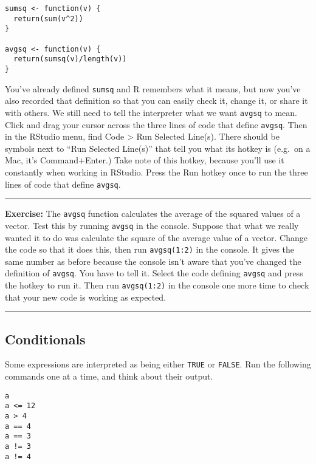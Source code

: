 \documentclass[]{book}
\theoremstyle{definition}
\theoremstyle{definition}
\theoremstyle{definition}
\theoremstyle{remark}
\begin{document}
\begin{verbatim}
sumsq <- function(v) {
  return(sum(v^2))
}

avgsq <- function(v) {
  return(sumsq(v)/length(v))
}
\end{verbatim}

You've already defined \texttt{sumsq} and R remembers what it means, but
now you've also recorded that definition so that you can easily check
it, change it, or share it with others. We still need to tell the
interpreter what we want \texttt{avgsq} to mean. Click and drag your
cursor across the three lines of code that define \texttt{avgsq}. Then
in the RStudio menu, find Code \textgreater{} Run Selected Line(s).
There should be symbols next to ``Run Selected Line(s)'' that tell you
what its hotkey is (e.g.~on a Mac, it's Command+Enter.) Take note of
this hotkey, because you'll use it constantly when working in RStudio.
Press the Run hotkey once to run the three lines of code that define
\texttt{avgsq}.

\begin{center}\rule{0.5\linewidth}{\linethickness}\end{center}

\textbf{Exercise:} The \texttt{avgsq} function calculates the average of
the squared values of a vector. Test this by running \texttt{avgsq} in
the console. Suppose that what we really wanted it to do was calculate
the square of the average value of a vector. Change the code so that it
does this, then run \texttt{avgsq(1:2)} in the console. It gives the
same number as before because the console isn't aware that you've
changed the definition of \texttt{avgsq}. You have to tell it. Select
the code defining \texttt{avgsq} and press the hotkey to run it. Then
run \texttt{avgsq(1:2)} in the console one more time to check that your
new code is working as expected.

\begin{center}\rule{0.5\linewidth}{\linethickness}\end{center}

\hypertarget{conditionals}{%
\subsection{Conditionals}\label{conditionals}}

Some expressions are interpreted as being either \texttt{TRUE} or
\texttt{FALSE}. Run the following commands one at a time, and think
about their output.

\begin{verbatim}
a
a <= 12
a > 4
a == 4
a == 3
a != 3
a != 4
\end{verbatim}
\end{document}
